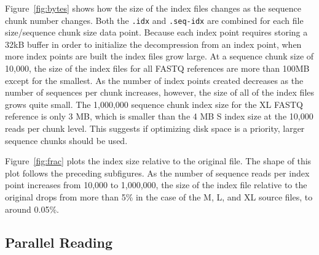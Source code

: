 Figure~\ref{fig:bytes} shows how the size of the index files changes as the
sequence chunk number changes. Both the \texttt{.idx} and \texttt{.seq-idx} are
combined for each file size/sequence chunk size data point. Because each index
point requires storing a 32kB buffer in order to initialize the \zlib
decompression from an index point, when more index points are built the index
files grow large. At a sequence chunk size of 10,000, the size of the index
files for all \gzip FASTQ references are more than 100MB except for the
smallest. As the number of index points created decreases as the number of
sequences per chunk increases, however, the size of all of the index files grows
quite small. The 1,000,000 sequence chunk index size for the XL FASTQ reference
is only 3 MB, which is smaller than the 4 MB S index size at the 10,000 reads
per chunk level. This suggests if optimizing disk space is a priority, larger
sequence chunks should be used.

Figure~\ref{fig:frac} plots the index size relative to the original \gzip file.
The shape of this plot follows the preceding subfigures. As the number of
sequence reads per index point increases from 10,000 to 1,000,000, the size of
the index file relative to the original \gzip drops from more than 5\% in the
case of the M, L, and XL source files, to around 0.05\%.

\subsection{Parallel Reading}
\label{sec:readresults}

